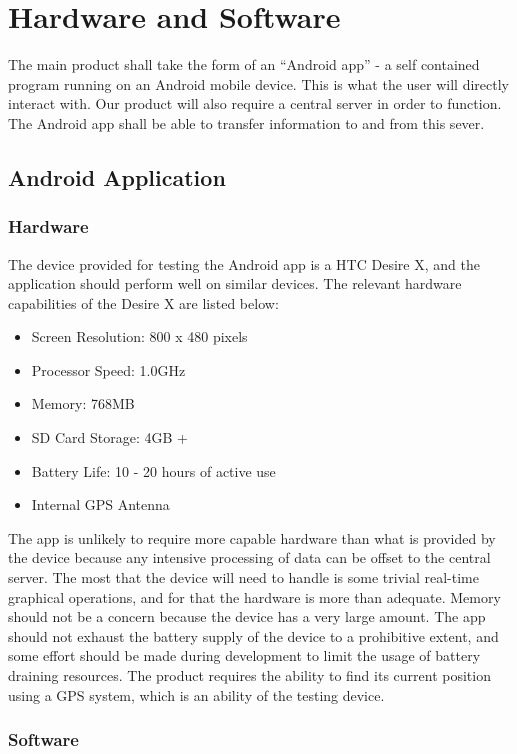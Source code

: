\section{Hardware and Software}
	The main product shall take the form of an ``Android app'' - a self contained program running on an Android mobile device. This is what the user will directly interact with. Our product will also require a central server in order to function. The Android app shall be able to transfer information to and from this sever.
	\subsection{Android Application}
		\subsubsection{Hardware}
			The device provided for testing the Android app is a HTC Desire X, and the application should perform well on similar devices. The relevant hardware capabilities of the Desire X are listed below\cite{htcdesirex}:

			\begin{itemize}
				\item Screen Resolution: 800 x 480 pixels
				\item Processor Speed: 1.0GHz
				\item Memory: 768MB
				\item SD Card Storage: 4GB +
				\item Battery Life: 10 - 20 hours of active use
				\item Internal GPS Antenna
			\end{itemize}

			\noindent
			The app is unlikely to require more capable hardware than what is provided by the device because any intensive processing of data can be offset to the central server. The most that the device will need to handle is some trivial real-time graphical operations, and for that the hardware is more than adequate. Memory should not be a concern because the device has a very large amount. The app should not exhaust the battery supply of the device to a prohibitive extent, and some effort should be made during development to limit the usage of battery draining resources. The product requires the ability to find its current position using a GPS system, which is an ability of the testing device.
		\subsubsection{Software}
